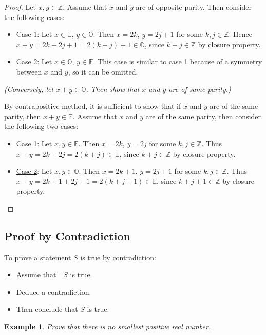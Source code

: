 \documentclass[10pt,reqno]{book}
\theoremstyle{plain}
\newtheorem{example}{Example}
\def\Z{\mathbb{Z}}
\def\E{\mathbb{E}}
\def\O{\mathbb{O}}
\begin{document}
	\begin{proof}
		Let $ x,y \in \Z $. Assume that $ x $ and $ y $ are of opposite parity. Then consider the following cases:
		\begin{itemize}
			\item \underline{Case 1}: Let $ x \in \E $, $ y \in \O $. Then $ x = 2k $, $ y = 2j+1 $ for some $ k,j \in \Z $. Hence $ x + y = 2k + 2j+1 = 2(k+j) + 1 \in \O $, since $ k+j \in \Z $ by closure property.
			\item \underline{Case 2}: Let $ x \in \O $, $ y \in \E $. This case is similar to case 1 because of a symmetry between $ x $ and $ y $, so it can be omitted.
		\end{itemize}
		\begin{center}
			\textit{(Conversely, let $ x + y \in \O $. Then show that $ x $ and $ y $ are of same parity.)}
		\end{center}
		By contrapositive method, it is sufficient to show that if $ x $ and $ y $ are of the same parity, then $ x+y \in \E $. Assume that $ x $ and $ y $ are of the same parity, then consider the following two cases:
		\begin{itemize}
			\item \underline{Case 1}: Let $ x,y \in \E $. Then $ x = 2k $, $ y = 2j $ for some $ k,j \in \Z $. Thus $ x + y = 2k + 2j = 2(k+j) \in \E $, since $ k+j \in \Z $ by closure property.
			\item \underline{Case 2}: Let $ x,y \in \O $. Then $ x = 2k+1 $, $ y = 2j+1 $ for some $ k,j \in \Z $. Thus $ x+y = 2k+1 + 2j+1 = 2(k+j+1) \in \E $, since $ k+j+1 \in \Z $ by closure property.
		\end{itemize}
	\end{proof}
	
	\subsection*{Proof by Contradiction}
	
	To prove a statement $ S $ is true by contradiction:
	\begin{itemize}
		\item Assume that $ \neg S $ is true.
		\item Deduce a contradiction.
		\item Then conclude that $ S $ is true.
	\end{itemize}
	
	\begin{example}
		Prove that there is no smallest positive real number.
	\end{example}
\end{document}
